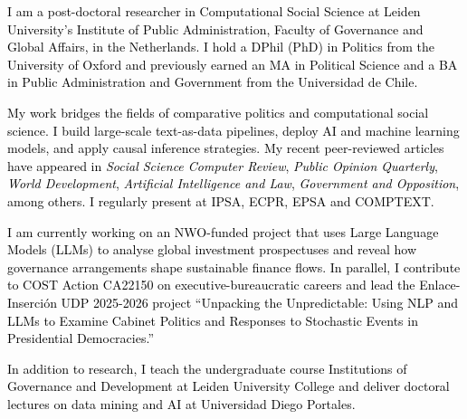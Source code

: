 \begin{cvparagraph}

\textcolor{black}{I am a post-doctoral researcher in Computational Social Science at Leiden University’s Institute of Public Administration, Faculty of Governance and Global Affairs, in the Netherlands. I hold a DPhil (PhD) in Politics from the University of Oxford and previously earned an MA in Political Science and a BA in Public Administration and Government from the Universidad de Chile.}



\textcolor{black}{My work bridges the fields of comparative politics and computational social science. I build large-scale text-as-data pipelines, deploy AI and machine learning models, and apply causal inference strategies. My recent peer-reviewed articles have appeared in {\itshape Social Science Computer Review}, {\itshape Public Opinion Quarterly}, {\itshape World Development}, {\itshape Artificial Intelligence and Law}, {\itshape Government and Opposition}, among others. I regularly present at IPSA, ECPR, EPSA and COMPTEXT.}

\textcolor{black}{I am currently working on an NWO-funded project that uses Large Language Models (LLMs) to analyse global investment prospectuses and reveal how governance arrangements shape sustainable finance flows. In parallel, I contribute to COST Action CA22150 on executive-bureaucratic careers and lead the Enlace-Inserción UDP 2025-2026 project “Unpacking the Unpredictable: Using NLP and LLMs to Examine Cabinet Politics and Responses to Stochastic Events in Presidential Democracies.”}

\textcolor{black}{In addition to research, I teach the undergraduate course Institutions of Governance and Development at Leiden University College and deliver doctoral lectures on data mining and AI at Universidad Diego Portales.}
\vspace{1mm}
\end{cvparagraph}

